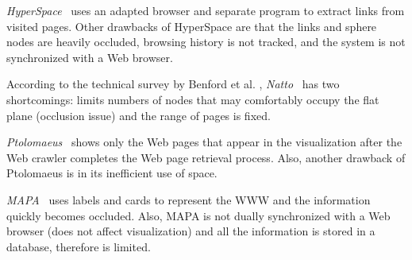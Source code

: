 \documentclass[]{article}
\begin{document}
{%
{\em HyperSpace}~\cite{wdbh-95} uses an adapted browser and separate program to extract links from visited pages.  Other drawbacks of HyperSpace are that the links and sphere nodes are heavily occluded, browsing history is not tracked, and the system is not synchronized with a Web browser.

According to the technical survey by Benford et al. \cite{survey-99}, {\em Natto}~\cite{sm97}  has two shortcomings: limits numbers of nodes that may comfortably occupy the flat plane (occlusion issue) and the range of pages is fixed.

{\em Ptolomaeus}~\cite{blv98} shows only the Web pages that appear in the visualization after the Web crawler completes the Web page retrieval process.
Also, another drawback of Ptolomaeus is in its inefficient use of space.

{\em MAPA}~\cite{dk98} uses labels and cards to represent the WWW and the information quickly becomes occluded.
Also, MAPA is not dually synchronized with a Web browser (does not affect visualization) and all the information is stored in a database, therefore is limited.

}
\end{document}
